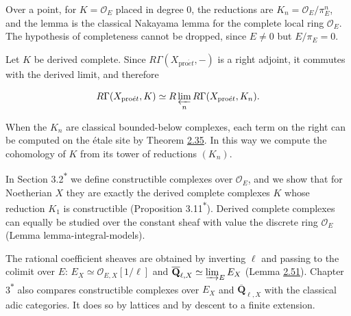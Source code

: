 \documentclass[11pt]{article}
\newcommand{\bpout}[1]{#1\textsuperscript{\hyperlink{bp-outside}{\ensuremath{\ast}}}}
\providecommand{\QbarX}{}\renewcommand{\QbarX}{\overline{\mathbf Q}_{\ell,X}}
\begin{document}
\label{bp190}%
Over a point, for \(K=\mathcal O_E\) placed in degree \(0\), the reductions are \(K_n=\mathcal O_E/\pi_E^n\), and the lemma is the classical Nakayama lemma for the complete local ring \(\mathcal O_E\). The hypothesis of completeness cannot be dropped, since \(E\neq0\) but \(E/\pi_E=0\).

Let \(K\) be derived complete. Since \(R\Gamma(X_{\mathrm{pro}\acute{e}t},-)\) is a right adjoint, it commutes with the derived limit, and therefore

\[
R\Gamma(X_{\mathrm{pro}\acute{e}t},K)
\simeq R\varprojlim_nR\Gamma(X_{\mathrm{pro}\acute{e}t},K_n).
\]

When the \(K_n\) are classical bounded-below complexes, each term on the right can be computed on the étale site by Theorem \hyperref[bp101]{2.35}. In this way we compute the cohomology of \(K\) from its tower of reductions \((K_n)\).

In Section \bpout{3.2} we define constructible complexes over \(\mathcal O_E\), and we show that for Noetherian \(X\) they are exactly the derived complete complexes \(K\) whose reduction \(K_1\) is constructible (Proposition \bpout{3.11}). Derived complete complexes can equally be studied over the constant sheaf with value the discrete ring \(\mathcal O_E\) (Lemma lemma-integral-models).

The rational coefficient sheaves are obtained by inverting \(\ell\) and passing to the colimit over \(E\): \(E_X\simeq\mathcal O_{E,X}[1/\ell]\) and \(\QbarX\simeq\varinjlim_E E_X\) (Lemma \hyperref[bp156]{2.51}). Chapter \bpout{3} also compares constructible complexes over \(E_X\) and \(\QbarX\) with the classical adic categories. It does so by lattices and by descent to a finite extension.



\clearpage{}\hypertarget{bp-outside}{}%
\end{document}
